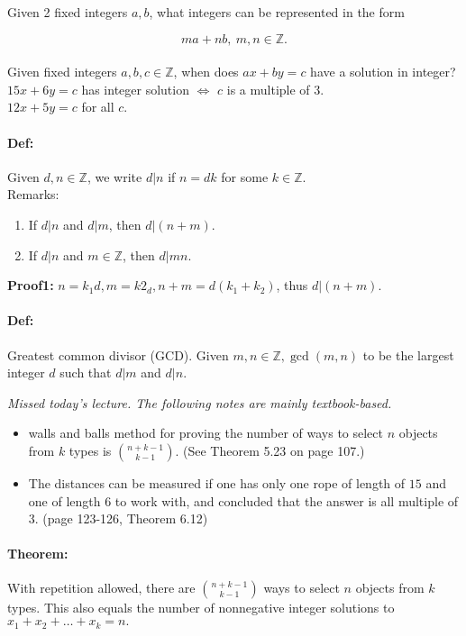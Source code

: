 \documentclass[a4paper, 11pt, twoside]{article}
\begin{document}
Given 2 fixed integers $a,b$, what integers can be represented in the form

\[ma+nb,\ m,n\in\mathbb{Z}.\]\\

Given fixed integers $a,b,c\in\mathbb{Z}$, when does $ax+by=c$ have a solution in integer?\\

$15x+6y=c$ has integer solution $\iff$ $c$ is a multiple of $3$.\\

$12x+5y=c$ for all $c$.\\

\paragraph{Def:} Given $d,n\in\mathbb{Z}$, we write $d|n$ if $n=dk$ for some $k\in\mathbb{Z}$.\\

Remarks:
\begin{enumerate}
	\item If $d|n$ and $d|m$, then $d|(n+m)$.
	\item If $d|n$ and $m\in\mathbb{Z}$, then $d|mn$.
\end{enumerate}

\textbf{Proof1:} $n=k_1d, m=k2_d, n+m=d(k_1+k_2)$, thus $d|(n+m)$.\\

\paragraph{Def:} Greatest common divisor (GCD). Given $m,n\in\mathbb{Z}, \gcd(m,n)$ to be the largest integer $d$ such that $d|m$ and $d|n$.


\pagebreak

\textit{Missed today's lecture. The following notes are mainly textbook-based.}

\begin{itemize}
	\item walls and balls method for proving the number of ways to select $n$ objects from $k$ types is ${n+k-1 \choose k-1}$. (See Theorem 5.23 on page 107.)
	\item The distances can be measured if one has only one rope of length of $15$ and one of length $6$ to work with, and concluded that the answer is all multiple of $3$. (page 123-126, Theorem 6.12)
\end{itemize}

\paragraph{Theorem:} With repetition allowed, there are ${n+k-1\choose k-1}$ ways to select $n$ objects from $k$ types. This also equals the number of nonnegative integer solutions to $x_1+x_2+\dots +x_k=n.$
\end{document}
